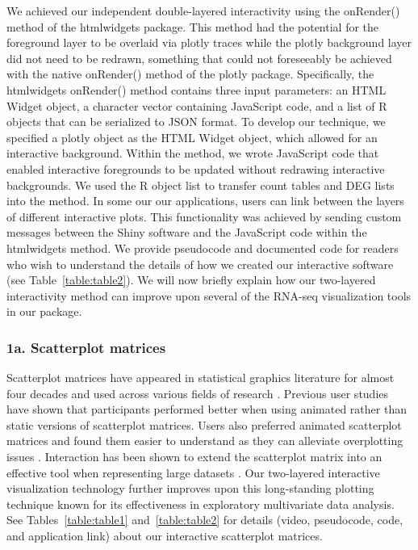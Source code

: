 \documentclass[parskip=full]{bmcart}
\begin{document}
We achieved our independent double-layered interactivity using the onRender() method of the htmlwidgets package. This method had the potential for the foreground layer to be overlaid via plotly traces while the plotly background layer did not need to be redrawn, something that could not foreseeably be achieved with the native onRender() method of the plotly package. Specifically, the htmlwidgets onRender() method contains three input parameters: an HTML Widget object, a character vector containing JavaScript code, and a list of R objects that can be serialized to JSON format. To develop our technique, we specified a plotly object as the HTML Widget object, which allowed for an interactive background. Within the method, we wrote JavaScript code that enabled interactive foregrounds to be updated without redrawing interactive backgrounds. We used the R object list to transfer count tables and DEG lists into the method. In some our our applications, users can link between the layers of different interactive plots. This functionality was achieved by sending custom messages between the Shiny software and the JavaScript code within the htmlwidgets method. We provide pseudocode and documented code for readers who wish to understand the details of how we created our interactive software (see Table~\ref{table:table2}). We will now briefly explain how our two-layered interactivity method can improve upon several of the RNA-seq visualization tools in our package. 

\subsubsection*{1a. Scatterplot matrices}

Scatterplot matrices have appeared in statistical graphics literature for almost four decades and used across various fields of research \cite{becker1984brushing, carr1984graphical, tufte2001visual, tukey1981graphical}. Previous user studies have shown that participants performed better when using animated rather than static versions of scatterplot matrices. Users also preferred animated scatterplot matrices and found them easier to understand as they can alleviate overplotting issues \cite{chen2018using}. Interaction has been shown to extend the scatterplot matrix into an effective tool when representing large datasets \cite{carr1987scatterplot}. Our two-layered interactive visualization technology further improves upon this long-standing plotting technique known for its effectiveness in exploratory multivariate data analysis. See Tables~\ref{table:table1} and~\ref{table:table2} for details (video, pseudocode, code, and application link) about our interactive scatterplot matrices.
\end{document}
